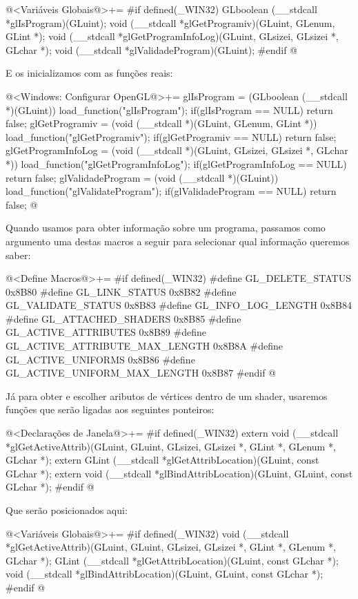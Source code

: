 \iniciocodigo
@<Variáveis Globais@>+=
#if defined(_WIN32)
GLboolean (__stdcall *glIsProgram)(GLuint);
void (__stdcall *glGetProgramiv)(GLuint, GLenum, GLint *);
void (__stdcall *glGetProgramInfoLog)(GLuint, GLsizei, GLsizei *, GLchar *);
void (__stdcall *glValidadeProgram)(GLuint);
#endif
@
\fimcodigo

E os inicializamos com as funções reais:

\iniciocodigo
@<Windows: Configurar OpenGL@>+=
glIsProgram = (GLboolean (__stdcall *)(GLuint)) load_function("glIsProgram");
if(glIsProgram == NULL) return false;
glGetProgramiv = (void (__stdcall *)(GLuint, GLenum, GLint *))
                    load_function("glGetProgramiv");
if(glGetProgramiv == NULL) return false;
glGetProgramInfoLog = (void (__stdcall *)(GLuint, GLsizei, GLsizei *, GLchar *))
                          load_function("glGetProgramInfoLog");
if(glGetProgramInfoLog == NULL) return false;
glValidadeProgram = (void (__stdcall *)(GLuint))
                     load_function("glValidateProgram");
if(glValidadeProgram == NULL) return false;
@
\fimcodigo

Quando usamos  para obter informação sobre
um programa, passamos como argumento uma destas macros a seguir para
selecionar qual informação queremos saber:

\iniciocodigo
@<Define Macros@>+=
#if defined(_WIN32)
#define GL_DELETE_STATUS               0x8B80
#define GL_LINK_STATUS                 0x8B82
#define GL_VALIDATE_STATUS             0x8B83
#define GL_INFO_LOG_LENGTH             0x8B84
#define GL_ATTACHED_SHADERS            0x8B85
#define GL_ACTIVE_ATTRIBUTES           0x8B89
#define GL_ACTIVE_ATTRIBUTE_MAX_LENGTH 0x8B8A
#define GL_ACTIVE_UNIFORMS             0x8B86
#define GL_ACTIVE_UNIFORM_MAX_LENGTH   0x8B87
#endif
@
\fimcodigo

Já para obter e escolher aributos de vértices dentro de um shader,
usaremos funções que serão ligadas aos seguintes ponteiros:

\iniciocodigo
@<Declarações de Janela@>+=
#if defined(_WIN32)
extern void (__stdcall *glGetActiveAttrib)(GLuint, GLuint, GLsizei, GLsizei *,
                                           GLint *, GLenum *, GLchar *);
extern GLint (__stdcall *glGetAttribLocation)(GLuint, const GLchar *);
extern void (__stdcall *glBindAttribLocation)(GLuint, GLuint, const GLchar *);
#endif
@
\fimcodigo

Que serão posicionados aqui:

\iniciocodigo
@<Variáveis Globais@>+=
#if defined(_WIN32)
void (__stdcall *glGetActiveAttrib)(GLuint, GLuint, GLsizei, GLsizei *, GLint *,
                                    GLenum *, GLchar *);
GLint (__stdcall *glGetAttribLocation)(GLuint, const GLchar *);
void (__stdcall *glBindAttribLocation)(GLuint, GLuint, const GLchar *);
#endif
@
\fimcodigo

